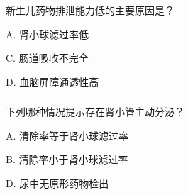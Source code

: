\documentclass[dvipsnames, svgnames, x11names]{beamer}
\begin{document}
\begin{frame}[t]
    \frametitle{}
    \begin{question}
        新生儿药物排泄能力低的主要原因是？
        \tcblower

        A. 肾小球滤过率低


        C. 肠道吸收不完全

        D. 血脑屏障通透性高
    \end{question}
\end{frame}


\begin{frame}[t]
    \frametitle{}
    \begin{question}
        下列哪种情况提示存在肾小管主动分泌？
        \tcblower

        A. 清除率等于肾小球滤过率

        B. 清除率小于肾小球滤过率


        D. 尿中无原形药物检出
    \end{question}
\end{frame}
\end{document}
